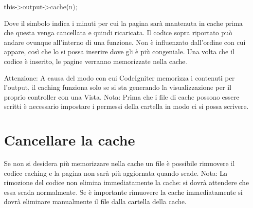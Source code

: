 \begin{code}
this->output->cache(n);
\end{code}

Dove il simbolo  indica i minuti per cui la pagina sarà mantenuta in cache prima che questa venga cancellata e quindi ricaricata. Il codice sopra riportato può andare ovunque all'interno di una funzione. Non è influenzato dall'ordine con cui appare, così che lo si possa inserire dove gli è più congeniale. Una volta che il codice è inserito, le pagine verranno memorizzate nella cache.

Attenzione: A causa del modo con cui CodeIgniter memorizza i contenuti per l'output, il caching funziona solo se si sta generando la visualizzazione per il proprio controller con una Vista. 
Nota: Prima che i file di cache possono essere scritti è necessario impostare i permessi della cartella  in modo ci si possa scrivere.

\section*{Cancellare la cache}
Se non si desidera più memorizzare nella cache un file è possibile rimuovere il codice caching e la pagina non sarà più aggiornata quando scade. 
Nota: La rimozione del codice non elimina immediatamente la cache: si dovrà attendere che essa scada normalmente. Se è importante rimuovere la cache immediatamente si dovrà eliminare manualmente il file dalla cartella della cache.